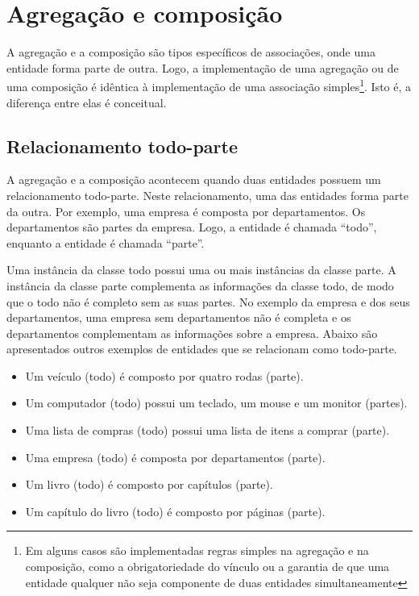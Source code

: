 \chapter{Agregação e composição}

A agregação e a composição são tipos específicos de associações, onde uma entidade forma parte de outra. Logo, a implementação de uma agregação ou de uma composição é idêntica à implementação de uma associação simples\footnote{Em alguns casos são implementadas regras simples na agregação e na composição, como a obrigatoriedade do vínculo ou a garantia de que uma entidade qualquer não seja componente de duas entidades simultaneamente}. Isto é, a diferença entre elas é conceitual.

\section{Relacionamento todo-parte}

A agregação e a composição acontecem quando duas entidades possuem um relacionamento todo-parte. Neste relacionamento, uma das entidades forma parte da outra. Por exemplo, uma empresa é composta por departamentos. Os departamentos são partes da empresa. Logo, a entidade  é chamada ``todo'', enquanto a entidade  é chamada ``parte''.

Uma instância da classe todo possui uma ou mais instâncias da classe parte. A instância da classe parte complementa as informações da classe todo, de modo que o todo não é completo sem as suas partes. No exemplo da empresa e dos seus departamentos, uma empresa sem departamentos não é completa e os departamentos complementam as informações sobre a empresa. Abaixo são apresentados outros exemplos de entidades que se relacionam como todo-parte.

\begin{itemize}
	\item Um veículo (todo) é composto por quatro rodas (parte).
	\item Um computador (todo) possui um teclado, um mouse e um monitor (partes).
	\item Uma lista de compras (todo) possui uma lista de itens a comprar (parte).
	\item Uma empresa (todo) é composta por departamentos (parte).
	\item Um livro (todo) é composto por capítulos (parte).
	\item Um capítulo do livro (todo) é composto por páginas (parte).
\end{itemize}

